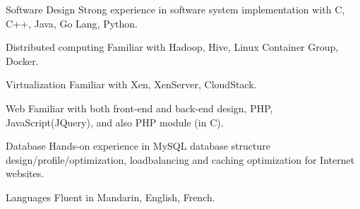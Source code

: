 


\begin{cvskills}

  \cvskill
    {Software Design} %
    {Strong experience in software system implementation with C, C++, Java, Go Lang, Python.} %

  \cvskill
    {Distributed computing} %
    {Familiar with Hadoop, Hive, Linux Container Group, Docker.} %

  \cvskill
    {Virtualization} %
    {Familiar with Xen, XenServer, CloudStack.} %

  \cvskill
    {Web} %
    {Familiar with both front-end and back-end design, PHP, JavaScript(JQuery), and also PHP module (in C).} %

  \cvskill
    {Database} %
    {Hands-on experience in MySQL database structure design/profile/optimization, loadbalancing and caching optimization for Internet websites.} %

  \cvskill
    {Languages} %
    {Fluent in Mandarin, English, French.} %


\end{cvskills}
